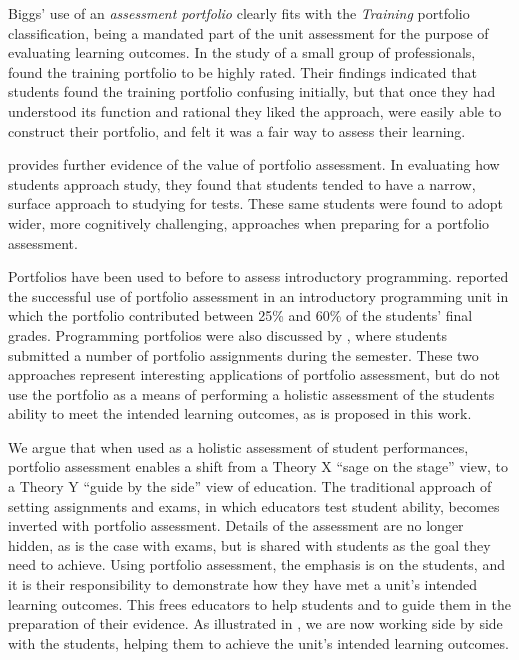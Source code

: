 Biggs' use of an \emph{assessment portfolio} clearly fits with the \emph{Training} portfolio classification, being a mandated part of the unit assessment for the purpose of evaluating learning outcomes. In the study of a small group of professionals, \citet{Smith:2001} found the training portfolio to be highly rated. Their findings indicated that students found the training portfolio confusing initially, but that once they had understood its function and rational they liked the approach, were easily able to construct their portfolio, and felt it was a fair way to assess their learning.

\citet{Tang:1999} provides further evidence of the value of portfolio assessment. In evaluating how students approach study, they found that students tended to have a narrow, surface approach to studying for tests. These same students were found to adopt wider, more cognitively challenging, approaches when preparing for a portfolio assessment. 

Portfolios have been used to before to assess introductory programming. \cite{Plimmer:2000} reported the successful use of portfolio assessment in an introductory programming unit in which the portfolio contributed between 25\% and 60\% of the students' final grades. Programming portfolios were also discussed by \cite{Jones:2010}, where students submitted a number of portfolio assignments during the semester. These two approaches represent interesting applications of portfolio assessment, but do not use the portfolio as a means of performing a holistic assessment of the students ability to meet the intended learning outcomes, as is proposed in this work.


%

We argue that when used as a holistic assessment of student performances, portfolio assessment enables a shift from a Theory X ``sage on the stage'' view, to a Theory Y ``guide by the side'' view of education. The traditional approach of setting assignments and exams, in which educators test student ability, becomes inverted with portfolio assessment. Details of the assessment are no longer hidden, as is the case with exams, but is shared with students as the goal they need to achieve. Using portfolio assessment, the emphasis is on the students, and it is their responsibility to demonstrate how they have met a unit's intended learning outcomes. This frees educators to help students and to guide them in the preparation of their evidence. As illustrated in , we are now working side by side with the students, helping them to achieve the unit's intended learning outcomes. 

